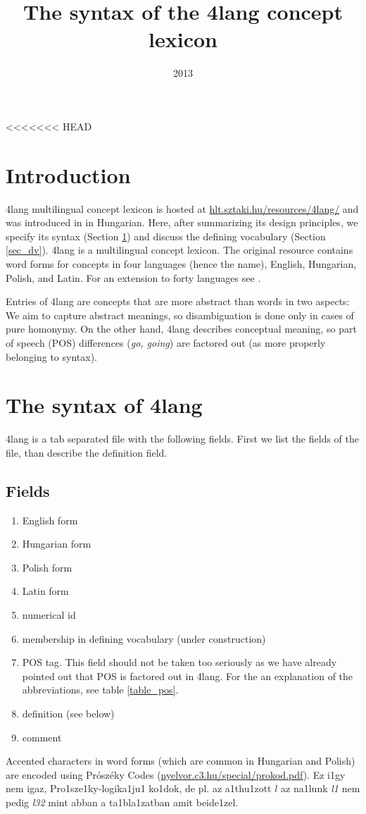 \documentclass[a4paper,10pt]{article}
\title{The syntax of the 4lang concept lexicon}
\date{2013}
\begin{document}
\maketitle
<<<<<<< HEAD
\section*{Introduction}
    4lang multilingual concept lexicon is hosted at \url{hlt.sztaki.hu/resources/4lang/} and was introduced in \cite{Kornai:2013} in Hungarian. Here, after summarizing its design principles, we specify                        its syntax (Section \ref{sec_synt}) and discuss the defining vocabulary (Section \ref{sec_dv}).
4lang is a multilingual concept lexicon. The original resource contains word forms for concepts in four languages (hence the name), English, Hungarian, Polish, and Latin. For an extension to forty languages see \cite{Acs:2013}.

Entries of 4lang are concepts that are more abstract than words in two
aspects: We aim to capture abstract meanings, so disambiguation is done only
in cases of pure homonymy. On the other hand, 4lang describes conceptual
meaning, so part of speech (POS) differences (\emph{go, going}) are factored
out (as more properly belonging to syntax).
\section{The syntax of 4lang}\label{sec_synt}
4lang is a tab separated file with the following fields. First we list the fields of the file, than describe the definition field.
\subsection{Fields}
\begin{enumerate}
 \item English form
\item Hungarian form
\item Polish form
\item Latin form
\item numerical id
\item membership in defining vocabulary (under construction)
\item POS tag. This field should not be taken too seriously as we have already pointed out that POS is factored out in 4lang. For the an explanation of the abbreviations, see table \ref{table_pos}.
\item definition (see below)
\item comment
\end{enumerate}
Accented characters in word forms (which are common in Hungarian and Polish)
are encoded using Prószéky Codes (\url{nyelvor.c3.hu/special/prokod.pdf}). 
{\color{red} Ez i1gy nem igaz, Pro1sze1ky-logika1ju1 ko1dok, de pl. az
  a1thu1zott $l$ az na1lunk {\it l1} nem pedig {\it l32} mint abban a 
ta1bla1zatban amit beide1zel.}
\end{document}
